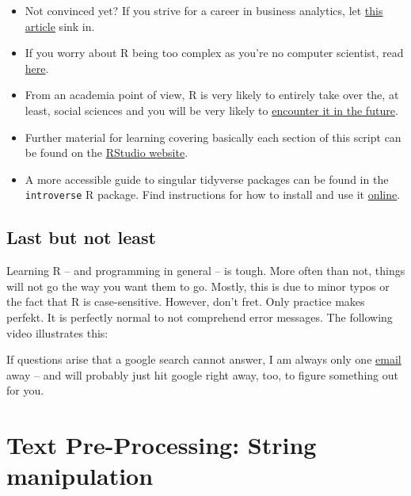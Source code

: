 \documentclass[
]{book}
\providecommand{\tightlist}{%
  \setlength{\itemsep}{0pt}\setlength{\parskip}{0pt}}
\begin{document}
\begin{itemize}
\tightlist
\item
  Not convinced yet? If you strive for a career in business analytics, let \href{https://www.business-science.io/business/2020/12/17/six-reasons-to-use-R-for-business-2021.html}{this article} sink in.
\item
  If you worry about R being too complex as you're no computer scientist, read \href{https://www.dezyre.com/article/why-is-now-the-time-to-learn-r-programming/178}{here}.
\item
  From an academia point of view, R is very likely to entirely take over the, at least, social sciences and you will be very likely to \href{https://campus.sagepub.com/blog/why-universities-are-switching-to-r-for-social-science}{encounter it in the future}.
\item
  Further material for learning covering basically each section of this script can be found on the \href{https://rstudio.cloud/learn/primers}{RStudio website}.
\item
  A more accessible guide to singular tidyverse packages can be found in the \texttt{introverse} R package. Find instructions for how to install and use it \href{https://spielmanlab.github.io/introverse/index.html}{online}.
\end{itemize}

\hypertarget{last-but-not-least}{%
\section{Last but not least}\label{last-but-not-least}}

Learning R -- and programming in general -- is tough. More often than not, things will not go the way you want them to go. Mostly, this is due to minor typos or the fact that R is case-sensitive. However, don't fret. Only practice makes perfekt. It is perfectly normal to not comprehend error messages. The following video illustrates this:

If questions arise that a google search cannot answer, I am always only one \href{mailto:\%20felix.lennert@ensae.fr}{email} away -- and will probably just hit google right away, too, to figure something out for you.

\hypertarget{text-pre-processing-string-manipulation}{%
\chapter{Text Pre-Processing: String manipulation}\label{text-pre-processing-string-manipulation}}
\end{document}

